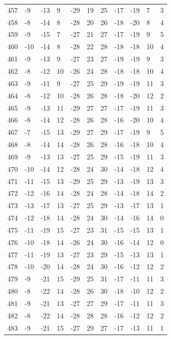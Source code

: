 \begin{table}[H]
\begin{tabular}{lllllllllll}
457 & -9 & -13 & 9 & -29 & 19 & 25 & -17 & -19 & 7 & 3 \\
458 & -8 & -14 & 8 & -28 & 20 & 26 & -18 & -20 & 8 & 4 \\
459 & -9 & -15 & 7 & -27 & 21 & 27 & -17 & -19 & 9 & 5 \\
460 & -10 & -14 & 8 & -28 & 22 & 28 & -18 & -18 & 10 & 4 \\
461 & -9 & -13 & 9 & -27 & 23 & 27 & -19 & -19 & 9 & 3 \\
462 & -8 & -12 & 10 & -26 & 24 & 28 & -18 & -18 & 10 & 4 \\
463 & -9 & -11 & 9 & -27 & 25 & 29 & -19 & -19 & 11 & 3 \\
464 & -8 & -12 & 10 & -28 & 26 & 28 & -18 & -20 & 12 & 2 \\
465 & -9 & -13 & 11 & -29 & 27 & 27 & -17 & -19 & 11 & 3 \\
466 & -8 & -14 & 12 & -28 & 26 & 28 & -16 & -20 & 10 & 4 \\
467 & -7 & -15 & 13 & -29 & 27 & 29 & -17 & -19 & 9 & 5 \\
468 & -8 & -14 & 14 & -28 & 26 & 28 & -16 & -18 & 10 & 4 \\
469 & -9 & -13 & 13 & -27 & 25 & 29 & -15 & -19 & 11 & 3 \\
470 & -10 & -14 & 12 & -28 & 24 & 30 & -14 & -18 & 12 & 4 \\
471 & -11 & -15 & 13 & -29 & 25 & 29 & -13 & -19 & 13 & 3 \\
472 & -12 & -16 & 14 & -28 & 24 & 28 & -14 & -18 & 14 & 2 \\
473 & -13 & -17 & 13 & -27 & 25 & 29 & -13 & -17 & 13 & 1 \\
474 & -12 & -18 & 14 & -28 & 24 & 30 & -14 & -16 & 14 & 0 \\
475 & -11 & -19 & 15 & -27 & 23 & 31 & -15 & -15 & 13 & 1 \\
476 & -10 & -18 & 14 & -26 & 24 & 30 & -16 & -14 & 12 & 0 \\
477 & -11 & -19 & 13 & -27 & 23 & 29 & -15 & -13 & 13 & 1 \\
478 & -10 & -20 & 14 & -28 & 24 & 30 & -16 & -12 & 12 & 2 \\
479 & -9 & -21 & 15 & -29 & 25 & 31 & -17 & -11 & 11 & 3 \\
480 & -8 & -22 & 14 & -28 & 26 & 30 & -18 & -10 & 12 & 2 \\
481 & -9 & -21 & 13 & -27 & 27 & 29 & -17 & -11 & 11 & 3 \\
482 & -8 & -22 & 14 & -28 & 28 & 28 & -16 & -12 & 12 & 2 \\
483 & -9 & -21 & 15 & -27 & 29 & 27 & -17 & -13 & 11 & 1 \\

\end{tabular}
\end{table}
